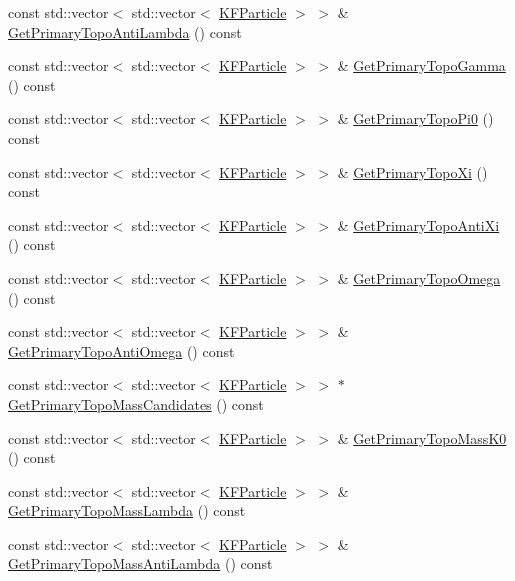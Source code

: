 \begin{DoxyCompactItemize}
\item 
const std\+::vector$<$ std\+::vector$<$ \hyperlink{classKFParticle}{K\+F\+Particle} $>$ $>$ \& \hyperlink{classKFParticleFinder_adad5f640ac64b9dec1b72b469ec05226}{Get\+Primary\+Topo\+Anti\+Lambda} () const 
\item 
const std\+::vector$<$ std\+::vector$<$ \hyperlink{classKFParticle}{K\+F\+Particle} $>$ $>$ \& \hyperlink{classKFParticleFinder_ae507e0b555d4f3c9084d3a4188c41653}{Get\+Primary\+Topo\+Gamma} () const 
\item 
const std\+::vector$<$ std\+::vector$<$ \hyperlink{classKFParticle}{K\+F\+Particle} $>$ $>$ \& \hyperlink{classKFParticleFinder_ac2e4c62f46b33f201d9d8531ce4950da}{Get\+Primary\+Topo\+Pi0} () const 
\item 
const std\+::vector$<$ std\+::vector$<$ \hyperlink{classKFParticle}{K\+F\+Particle} $>$ $>$ \& \hyperlink{classKFParticleFinder_ad60a81262c8d69a5a179766e220621fd}{Get\+Primary\+Topo\+Xi} () const 
\item 
const std\+::vector$<$ std\+::vector$<$ \hyperlink{classKFParticle}{K\+F\+Particle} $>$ $>$ \& \hyperlink{classKFParticleFinder_ada105af26be7f6f9448cf9e954b89276}{Get\+Primary\+Topo\+Anti\+Xi} () const 
\item 
const std\+::vector$<$ std\+::vector$<$ \hyperlink{classKFParticle}{K\+F\+Particle} $>$ $>$ \& \hyperlink{classKFParticleFinder_a6e4b12b80efebed377ea6757e2eec098}{Get\+Primary\+Topo\+Omega} () const 
\item 
const std\+::vector$<$ std\+::vector$<$ \hyperlink{classKFParticle}{K\+F\+Particle} $>$ $>$ \& \hyperlink{classKFParticleFinder_aea76ff429d88e037ad25d806ae34530d}{Get\+Primary\+Topo\+Anti\+Omega} () const 
\item 
const std\+::vector$<$ std\+::vector$<$ \hyperlink{classKFParticle}{K\+F\+Particle} $>$ $>$ $\ast$ \hyperlink{classKFParticleFinder_afe2cf855e5660059795ef32caa3ace23}{Get\+Primary\+Topo\+Mass\+Candidates} () const 
\item 
const std\+::vector$<$ std\+::vector$<$ \hyperlink{classKFParticle}{K\+F\+Particle} $>$ $>$ \& \hyperlink{classKFParticleFinder_ae674d079ab4800c12874ceba16bf7b7b}{Get\+Primary\+Topo\+Mass\+K0} () const 
\item 
const std\+::vector$<$ std\+::vector$<$ \hyperlink{classKFParticle}{K\+F\+Particle} $>$ $>$ \& \hyperlink{classKFParticleFinder_a7286e2c28c0e5d1350125ff5004094a3}{Get\+Primary\+Topo\+Mass\+Lambda} () const 
\item 
const std\+::vector$<$ std\+::vector$<$ \hyperlink{classKFParticle}{K\+F\+Particle} $>$ $>$ \& \hyperlink{classKFParticleFinder_aa2b604b08a599d4008c33491314bff66}{Get\+Primary\+Topo\+Mass\+Anti\+Lambda} () const 

\end{DoxyCompactItemize}
